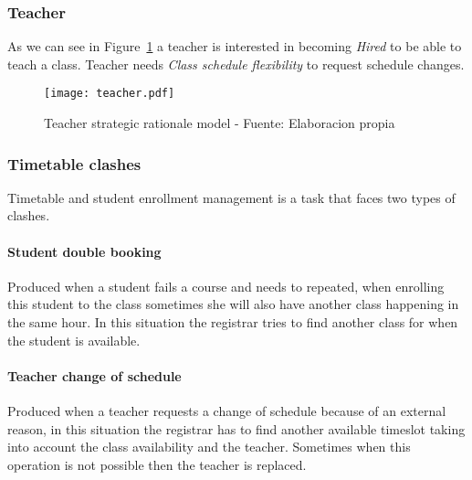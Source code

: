 \subsubsection{Teacher}
As we can see in Figure~\ref{fig:actorBoundaryTeacher} a teacher is interested in becoming \textit{Hired} to be able to teach a class.
Teacher needs \textit{Class schedule flexibility} to request schedule changes.

\begin{figure}
	\centering
	\caption{Teacher strategic rationale model - Fuente: Elaboracion propia}
	\label{fig:actorBoundaryTeacher}
	\texttt{[image: teacher.pdf]}
\end{figure}

\subsubsection{Timetable clashes}
Timetable and student enrollment management is a task that faces two types of clashes.

\paragraph{Student double booking} Produced when a student fails a course and needs to repeated, when enrolling this student to the class sometimes she will also have another class happening in the same hour.
In this situation the registrar tries to find another class for when the student is available.

\paragraph{Teacher change of schedule} Produced when a teacher requests a change of schedule because of an external reason, in this situation the registrar has to find another available timeslot taking into account the class availability and the teacher.
Sometimes when this operation is not possible then the teacher is replaced.
